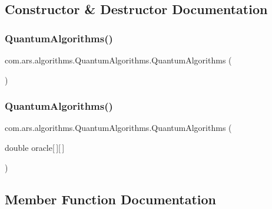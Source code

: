 \subsection{Constructor \& Destructor Documentation}
\hypertarget{classcom_1_1ars_1_1algorithms_1_1_quantum_algorithms_a55a8e679534f3f4e5629504d4eae8fc9}{}\label{classcom_1_1ars_1_1algorithms_1_1_quantum_algorithms_a55a8e679534f3f4e5629504d4eae8fc9} 
\subsubsection{\texorpdfstring{Quantum\+Algorithms()}{QuantumAlgorithms()}\hspace{0.1cm}{\footnotesize\ttfamily [1/2]}}
{\footnotesize\ttfamily com.\+ars.\+algorithms.\+Quantum\+Algorithms.\+Quantum\+Algorithms (\begin{DoxyParamCaption}{ }\end{DoxyParamCaption})}

\hypertarget{classcom_1_1ars_1_1algorithms_1_1_quantum_algorithms_a1ec69e5ec9aa5a35743950c4d4e50f62}{}\label{classcom_1_1ars_1_1algorithms_1_1_quantum_algorithms_a1ec69e5ec9aa5a35743950c4d4e50f62} 
\subsubsection{\texorpdfstring{Quantum\+Algorithms()}{QuantumAlgorithms()}\hspace{0.1cm}{\footnotesize\ttfamily [2/2]}}
{\footnotesize\ttfamily com.\+ars.\+algorithms.\+Quantum\+Algorithms.\+Quantum\+Algorithms (\begin{DoxyParamCaption}\item[{double}]{oracle\mbox{[}$\,$\mbox{]}\mbox{[}$\,$\mbox{]} }\end{DoxyParamCaption})}



\subsection{Member Function Documentation}
\hypertarget{classcom_1_1ars_1_1algorithms_1_1_quantum_algorithms_a15adb03c61ab3d3fe4f6abfeac1eeaef}{}\label{classcom_1_1ars_1_1algorithms_1_1_quantum_algorithms_a15adb03c61ab3d3fe4f6abfeac1eeaef} 
